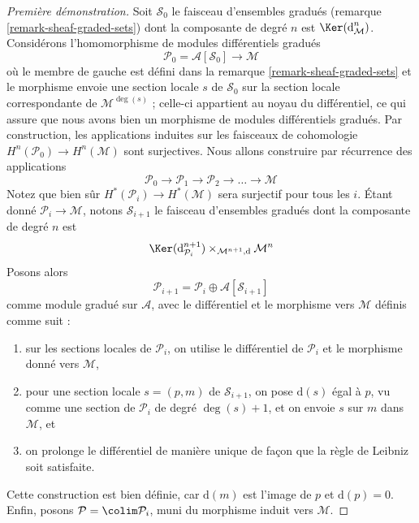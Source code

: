 \begin{proof}[Première démonstration]
Soit $\mathcal{S}_0$ le faisceau d'ensembles gradués (remarque \ref{remark-sheaf-graded-sets}) dont la composante de degré $n$ est $\Ker(\text{d}_\mathcal{M}^n)$.
Considérons l'homomorphisme de modules différentiels gradués
$$
\mathcal{P}_0 = \mathcal{A}[\mathcal{S}_0] \longrightarrow \mathcal{M}
$$
où le membre de gauche est défini dans la remarque \ref{remark-sheaf-graded-sets} et le morphisme envoie une section locale $s$ de $\mathcal{S}_0$ sur la section locale correspondante de $\mathcal{M}^{\deg(s)}$ ; celle-ci appartient au noyau du différentiel, ce qui assure que nous avons bien un morphisme de modules différentiels gradués.
Par construction, les applications induites sur les faisceaux de cohomologie $H^n(\mathcal{P}_0) \to H^n(\mathcal{M})$ sont surjectives.
Nous allons construire par récurrence des applications
$$
\mathcal{P}_0 \to \mathcal{P}_1 \to \mathcal{P}_2 \to \ldots \to \mathcal{M}
$$
Notez que bien sûr $H^*(\mathcal{P}_i) \to H^*(\mathcal{M})$ sera surjectif pour tous les $i$.
Étant donné $\mathcal{P}_i \to \mathcal{M}$, notons $\mathcal{S}_{i + 1}$ le faisceau d'ensembles gradués dont la composante de degré $n$ est
$$
\Ker(\text{d}_{\mathcal{P}_i}^{n + 1})
\times_{\mathcal{M}^{n + 1}, \text{d}}
\mathcal{M}^n
$$
Posons alors
$$
\mathcal{P}_{i + 1} = \mathcal{P}_i \oplus \mathcal{A}[\mathcal{S}_{i + 1}]
$$
comme module gradué sur $\mathcal{A}$, avec le différentiel et le morphisme vers $\mathcal{M}$ définis comme suit :
\begin{enumerate}
\item sur les sections locales de $\mathcal{P}_i$, on utilise le différentiel de $\mathcal{P}_i$ et le morphisme donné vers $\mathcal{M}$,
\item pour une section locale $s = (p, m)$ de $\mathcal{S}_{i + 1}$, on pose $\text{d}(s)$ égal à $p$, vu comme une section de $\mathcal{P}_i$ de degré $\deg(s) + 1$, et on envoie $s$ sur $m$ dans $\mathcal{M}$, et
\item on prolonge le différentiel de manière unique de façon que la règle de Leibniz soit satisfaite.
\end{enumerate}
Cette construction est bien définie, car $\text{d}(m)$ est l'image de $p$ et $\text{d}(p) = 0$.
Enfin, posons $\mathcal{P} = \colim \mathcal{P}_i$, muni du morphisme induit vers $\mathcal{M}$.


\end{proof}
